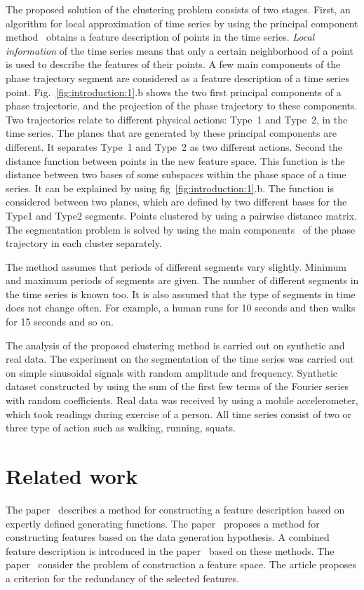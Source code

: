 \documentclass[12pt, twoside]{article}
\numberwithin{equation}{section}
\begin{document}
The proposed solution of the clustering problem consists of two stages.
First, an algorithm for local approximation of time series by using the principal component method~\cite{Shiglavsi1997} obtains a feature description of points in the time series.
\textit{Local information} of the time series means that only a certain neighborhood of a point is used to describe the features of their points.
A few main components of the phase trajectory segment are considered as a feature description of a time series point.
Fig.~\ref{fig:introduction:1}.b shows the two first principal components of a phase trajectorie, and the projection of the phase trajectory to these components.
Two trajectories relate to different physical actions: Type~1 and Type~2, in the time series.
The planes that are generated by these principal components are different.
It separates Type~1 and Type~2 as two different actions.
Second the distance function between points in the new feature space.
This function is the distance between two bases of some subspaces within the phase space of a time series.
It can be explained by using fig~\ref{fig:introduction:1}.b. The function is considered between two planes, which are defined by two different bases for the Type1 and Type2 segments.
Points clustered by using a pairwise distance matrix.
The segmentation problem is solved by using the main components~\cite{motrenko2015} of the phase trajectory in each cluster separately.

The method assumes that periods of different segments vary slightly. Minimum and maximum periods of segments are given. The number of different segments in the time series is known too.
It is also assumed that the type of segments in time does not change often. For example, a human runs for 10 seconds and then walks for 15 seconds and so on.

The analysis of the proposed clustering method is carried out on synthetic and real data. 
The experiment on the segmentation of the time series was carried out on simple sinusoidal signals with random amplitude and frequency.
Synthetic dataset constructed by using the sum of the first few terms of the Fourier series with random coefficients. 
Real data was received by using a mobile accelerometer, which took readings during exercise of a person. All time series consist of two or three type of action such as walking, running, squats.

\section{Related work}
The paper~\cite{kwapisz2010} describes a method for constructing a feature description based on expertly defined generating functions.
The paper~\cite{lukashin2003} proposes a method for constructing features based on the data generation hypothesis.
A combined feature description is introduced in the paper~\cite{Ivkin2015} based on these methods.
The paper~\cite{Katrutsa2015} consider the problem of construction a feature space. The article proposes a criterion for the redundancy of the selected features.
\end{document}
